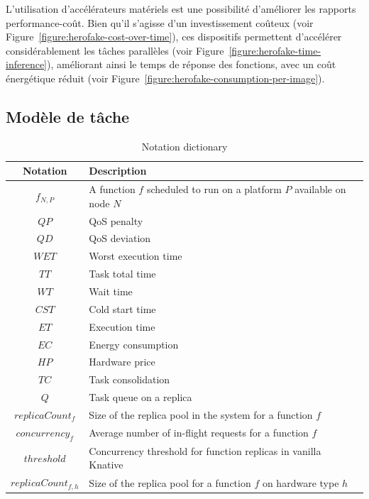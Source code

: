L'utilisation d'accélérateurs matériels est une possibilité d'améliorer les rapports performance-coût. Bien qu'il s'agisse d'un investissement coûteux (voir Figure~\ref{figure:herofake-cost-over-time}), ces dispositifs permettent d'accélérer considérablement les tâches parallèles (voir Figure~\ref{figure:herofake-time-inference}), améliorant ainsi le temps de réponse des fonctions, avec un coût énergétique réduit (voir Figure~\ref{figure:herofake-consumption-per-image}).

\subsection{Modèle de tâche} \label{model:tasks}

\begin{table}[t]
    \caption{Notation dictionary}
    \begin{center}
    \begin{tabular}{|c|L|}
    \hline
    \textbf{Notation} & \textbf{Description} \\ \hline
    $f_{N, P}$ & A function $f$ scheduled to run on a platform $P$ available on node $N$ \\ \hline
    $QP$ & QoS penalty \\ \hline
    $QD$ & QoS deviation \\ \hline
    $WET$ & Worst execution time \\ \hline
    $TT$ & Task total time \\ \hline
    $WT$ & Wait time \\ \hline
    $CST$ & Cold start time \\ \hline
    $ET$ & Execution time \\ \hline
    $EC$ & Energy consumption \\ \hline
    $HP$ & Hardware price \\ \hline
    $TC$ & Task consolidation \\ \hline
    $Q$ & Task queue on a replica \\ \hline
    $replicaCount_{f}$ & Size of the replica pool in the system for a function $f$ \\ \hline
    $concurrency_{f}$ & Average number of in-flight requests for a function $f$ \\ \hline
    $threshold$ & Concurrency threshold for function replicas in vanilla Knative \\ \hline
    $replicaCount_{f, h}$ & Size of the replica pool for a function $f$ on hardware type $h$ \\ \hline

\end{tabular}
\end{center}
\end{table}
